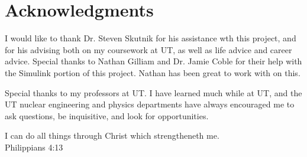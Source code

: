 \chapter*{Acknowledgments}
I would like to thank Dr. Steven Skutnik for his assistance wth this project, and for his advising both on my coursework at UT, as well as life advice and career advice. Special thanks to Nathan Gilliam and Dr. Jamie Coble for their help with the Simulink portion of this project. Nathan has been great to work with on this. \\
\par Special thanks to my professors at UT. I have learned much while at UT, and the UT nuclear engineering and physics departments have always encouraged me to ask questions, be inquisitive, and look for opportunities.


\pagebreak

\begin{centering}
\vspace{5cm}
I can do all things through Christ which strengtheneth me. \\
Philippians 4:13 \\
\end{centering}